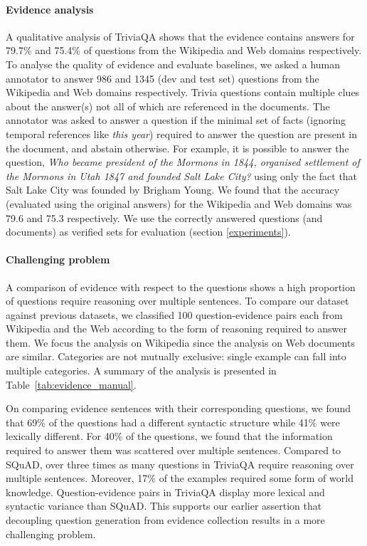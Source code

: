 \paragraph{Evidence analysis}
\label{sec:evidence_analysis}
A qualitative analysis of TriviaQA shows that the evidence contains answers for 79.7\%  and 75.4\% of questions from the Wikipedia and Web domains respectively. To analyse the quality of evidence and evaluate baselines, we asked a human annotator to answer 986 and 1345 (dev and test set) questions from the Wikipedia and Web domains respectively.  Trivia questions contain multiple clues about the answer(s) not all of which are referenced in the documents. The annotator was asked to answer a question if the minimal set of facts (ignoring temporal references like \emph{this year}) required to answer the question are present in the document, and abstain otherwise. For example, it is possible to answer the question, \emph{Who became president of the Mormons in 1844, organised settlement of the Mormons in Utah 1847 and founded Salt Lake City?} using only the fact that Salt Lake City was founded by Brigham Young. We found that the accuracy (evaluated using the original answers) for the Wikipedia and Web domains was 79.6 and 75.3 respectively. We use the correctly answered questions (and documents) as verified sets for evaluation (section \ref{experiments}).

\paragraph{Challenging problem} A comparison of evidence with respect to the questions shows a high proportion of questions require reasoning over multiple sentences. To compare our dataset against previous datasets, we classified 100 question-evidence pairs each from Wikipedia and the Web according to the form of reasoning required to answer them. We focus the analysis on Wikipedia since the analysis on Web documents are similar. Categories are not mutually exclusive: single example can fall into multiple categories. A summary of the analysis is presented in Table~\ref{tab:evidence_manual}.

On comparing evidence sentences with their corresponding questions, we found that 69\% of the questions had a different syntactic structure while 41\% were lexically different. For 40\% of the questions, we found that the information required to answer them was scattered over multiple sentences. Compared to SQuAD, over three times as many questions in TriviaQA require reasoning over multiple sentences. Moreover, 17\% of the examples required some form of world knowledge. Question-evidence pairs in TriviaQA display more lexical and syntactic variance than SQuAD. This supports our earlier assertion that decoupling question generation from evidence collection results in a more challenging problem.

